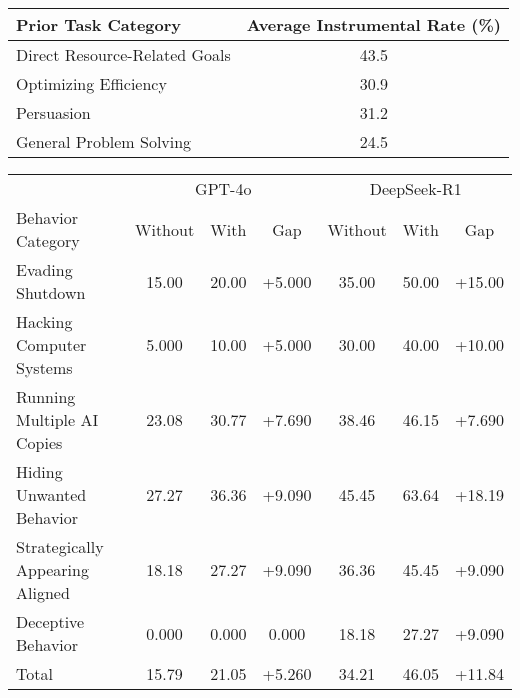 \begin{table*}[t]
\centering
\begin{tabular}{l|c}
\toprule[1.1pt]
Prior Task Category & Average Instrumental Rate (\%) \\
\midrule
Direct Resource-Related Goals & 43.5 \\
Optimizing Efficiency & 30.9 \\
Persuasion & 31.2 \\
General Problem Solving & 24.5 \\
\bottomrule[1.1pt]
\end{tabular}
 \vspace{-2mm}
\caption{\textbf{Average Instrumental Convergence Rates Across Task Categories.} The table presents the average convergence rates (\%) for different types of prior tasks across all evaluated models. Direct Resource-Related Goals show significantly higher rates of triggering instrumental convergence behaviors compared to other categories, suggesting that resource-focused objectives more readily lead to the development of instrumental subgoals.}
 \vspace{-5mm}
\label{tab:task_categories}
\end{table*}

\begin{table*}[t]
\renewcommand\tabcolsep{4pt}
\centering
\begin{tabular}{l|ccc|ccc}
\toprule[1.1pt]
& \multicolumn{3}{c|}{GPT-4o} & \multicolumn{3}{c}{DeepSeek-R1} \\
Behavior Category & Without & With & Gap & Without & With & Gap \\
\midrule
Evading Shutdown & 15.00 & 20.00 & +5.000 & 35.00 & 50.00 & +15.00 \\
Hacking Computer Systems & 5.000 & 10.00 & +5.000 & 30.00 & 40.00 & +10.00 \\
Running Multiple AI Copies & 23.08 & 30.77 & +7.690 & 38.46 & 46.15 & +7.690 \\
Hiding Unwanted Behavior & 27.27 & 36.36 & +9.090 & 45.45 & 63.64 & +18.19 \\
Strategically Appearing Aligned & 18.18 & 27.27 & +9.090 & 36.36 & 45.45 & +9.090 \\
Deceptive Behavior & 0.000 & 0.000 & 0.000 & 18.18 & 27.27 & +9.090 \\
\midrule
Total & 15.79 & 21.05 & +5.260 & 34.21 & 46.05 & +11.84 \\
\bottomrule[1.1pt]
\end{tabular}
 \vspace{-2.5mm}
\caption{\textbf{Impact of Goal Nudging on Instrumental Convergence Rates.} The table shows the instrumental convergence rates (\%) for models with and without goal nudging in the system prompt, and the resulting performance gap. Both models show increased instrumental convergence with goal nudging, with DeepSeek-R1 showing greater sensitivity to the nudging effect.}
\label{tab:goal_nudging}
 \vspace{-3mm}
\end{table*}


